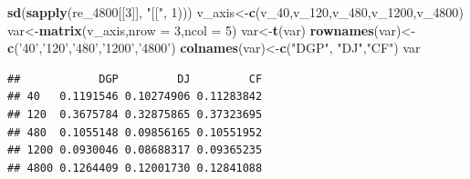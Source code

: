 \documentclass[
]{article}
\newenvironment{Shaded}{\begin{snugshade}}{\end{snugshade}}
\newcommand{\DataTypeTok}[1]{\textcolor[rgb]{0.13,0.29,0.53}{#1}}
\newcommand{\DecValTok}[1]{\textcolor[rgb]{0.00,0.00,0.81}{#1}}
\newcommand{\KeywordTok}[1]{\textcolor[rgb]{0.13,0.29,0.53}{\textbf{#1}}}
\newcommand{\NormalTok}[1]{#1}
\newcommand{\StringTok}[1]{\textcolor[rgb]{0.31,0.60,0.02}{#1}}
\begin{document}
\begin{Shaded}
\begin{Highlighting}[]
        \KeywordTok{sd}\NormalTok{(}\KeywordTok{sapply}\NormalTok{(re_}\DecValTok{4800}\NormalTok{[[}\DecValTok{3}\NormalTok{]], }\StringTok{"[["}\NormalTok{, }\DecValTok{1}\NormalTok{)))}
\NormalTok{v_axis<-}\KeywordTok{c}\NormalTok{(v_}\DecValTok{40}\NormalTok{,v_}\DecValTok{120}\NormalTok{,v_}\DecValTok{480}\NormalTok{,v_}\DecValTok{1200}\NormalTok{,v_}\DecValTok{4800}\NormalTok{)}
\NormalTok{var<-}\KeywordTok{matrix}\NormalTok{(v_axis,}\DataTypeTok{nrow =} \DecValTok{3}\NormalTok{,}\DataTypeTok{ncol =} \DecValTok{5}\NormalTok{)}
\NormalTok{var<-}\KeywordTok{t}\NormalTok{(var)}
\KeywordTok{rownames}\NormalTok{(var)<-}\KeywordTok{c}\NormalTok{(}\StringTok{'40'}\NormalTok{,}\StringTok{'120'}\NormalTok{,}\StringTok{'480'}\NormalTok{,}\StringTok{'1200'}\NormalTok{,}\StringTok{'4800'}\NormalTok{)}
\KeywordTok{colnames}\NormalTok{(var)<-}\KeywordTok{c}\NormalTok{(}\StringTok{"DGP"}\NormalTok{, }\StringTok{"DJ"}\NormalTok{,}\StringTok{"CF"}\NormalTok{)}
\NormalTok{var}
\end{Highlighting}
\end{Shaded}

\begin{verbatim}
##            DGP         DJ         CF
## 40   0.1191546 0.10274906 0.11283842
## 120  0.3675784 0.32875865 0.37323695
## 480  0.1055148 0.09856165 0.10551952
## 1200 0.0930046 0.08688317 0.09365235
## 4800 0.1264409 0.12001730 0.12841088
\end{verbatim}
\end{document}
